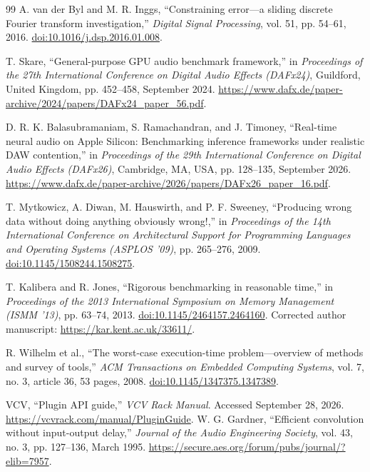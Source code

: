 \begin{thebibliography}{99}
A. van der Byl and M. R. Inggs, ``Constraining error---a sliding discrete
Fourier transform investigation,'' \emph{Digital Signal Processing},
vol. 51, pp. 54--61, 2016.
\href{https://doi.org/10.1016/j.dsp.2016.01.008}{doi:10.1016/j.dsp.2016.01.008}.

T. Skare, ``General-purpose GPU audio benchmark framework,'' in
\emph{Proceedings of the 27th International Conference on Digital Audio
Effects (DAFx24)}, Guildford, United Kingdom, pp. 452--458, September 2024.
\url{https://www.dafx.de/paper-archive/2024/papers/DAFx24_paper_56.pdf}.

D. R. K. Balasubramaniam, S. Ramachandran, and J. Timoney,
``Real-time neural audio on Apple Silicon: Benchmarking inference frameworks
under realistic DAW contention,'' in \emph{Proceedings of the 29th
International Conference on Digital Audio Effects (DAFx26)}, Cambridge, MA,
USA, pp. 128--135, September 2026.
\url{https://www.dafx.de/paper-archive/2026/papers/DAFx26_paper_16.pdf}.

T. Mytkowicz, A. Diwan, M. Hauswirth, and P. F. Sweeney,
``Producing wrong data without doing anything obviously wrong!,'' in
\emph{Proceedings of the 14th International Conference on Architectural
Support for Programming Languages and Operating Systems (ASPLOS '09)},
pp. 265--276, 2009.
\href{https://doi.org/10.1145/1508244.1508275}{doi:10.1145/1508244.1508275}.

T. Kalibera and R. Jones, ``Rigorous benchmarking in reasonable time,'' in
\emph{Proceedings of the 2013 International Symposium on Memory Management
(ISMM '13)}, pp. 63--74, 2013.
\href{https://doi.org/10.1145/2464157.2464160}{doi:10.1145/2464157.2464160}.
Corrected author manuscript: \url{https://kar.kent.ac.uk/33611/}.

R. Wilhelm et al., ``The worst-case execution-time problem---overview of
methods and survey of tools,'' \emph{ACM Transactions on Embedded Computing
Systems}, vol. 7, no. 3, article 36, 53 pages, 2008.
\href{https://doi.org/10.1145/1347375.1347389}{doi:10.1145/1347375.1347389}.

VCV, ``Plugin API guide,'' \emph{VCV Rack Manual}. Accessed September 28, 2026.
\url{https://vcvrack.com/manual/PluginGuide}.
W. G. Gardner, ``Efficient convolution without input-output delay,''
\emph{Journal of the Audio Engineering Society}, vol. 43, no. 3,
pp. 127--136, March 1995.
\url{https://secure.aes.org/forum/pubs/journal/?elib=7957}.


\end{thebibliography}
